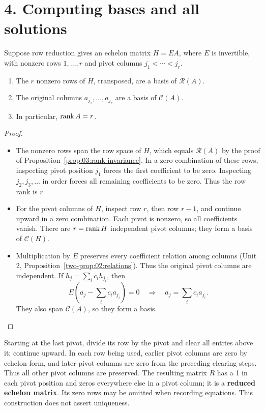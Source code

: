 \section*{4. Computing bases and all solutions}

\begin{theorem}\label{thm:03:pivots}
Suppose row reduction gives an echelon matrix \(H=EA\), where \(E\)
is invertible, with nonzero rows \(1,\ldots,r\) and pivot columns
\(j_1<\cdots<j_r\).
\begin{enumerate}
\item The \(r\) nonzero rows of \(H\), transposed, are a basis of \(\mathcal R(A)\).
\item The original columns \(a_{j_1},\ldots,a_{j_r}\) are a basis of \(\mathcal C(A)\).
\item In particular, \(\operatorname{rank} A=r\).
\end{enumerate}
\end{theorem}
\begin{proof}
\begin{itemize}
\item The nonzero rows span the row space of \(H\), which equals \(\mathcal R(A)\)
by the proof of Proposition~\ref{prop:03:rank-invariance}.
In a zero combination of these rows, inspecting pivot position \(j_1\)
forces the first coefficient to be zero. Inspecting \(j_2,j_3,\ldots\)
in order forces all remaining coefficients to be zero. Thus the row rank is \(r\).

\item For the pivot columns of \(H\), inspect row \(r\), then row \(r-1\),
and continue upward in a zero combination. Each pivot is nonzero, so all
coefficients vanish. There are \(r=\operatorname{rank} H\) independent pivot columns;
they form a basis of \(\mathcal C(H)\).
\item Multiplication by \(E\) preserves every coefficient relation among columns
(Unit 2, Proposition~\ref{two-prop:02:relations}).
Thus the original pivot columns are independent. If
\(h_j=\sum_i c_ih_{j_i}\), then
\[
E\left(a_j-\sum_i c_ia_{j_i}\right)=0
\quad\Longrightarrow\quad a_j=\sum_i c_ia_{j_i}.
\]
They also span \(\mathcal C(A)\), so they form a basis.
\end{itemize}
\end{proof}

Starting at the last pivot, divide its row by the pivot and clear all
entries above it; continue upward. In each row being used, earlier pivot
columns are zero by echelon form, and later pivot columns are zero from
the preceding clearing steps. Thus all other pivot columns are preserved.
The resulting matrix \(R\) has
a 1 in each pivot position and zeros everywhere else in a pivot column;
it is a \textbf{reduced echelon matrix}. Its zero rows may be omitted when
recording equations. This construction does not assert uniqueness.

